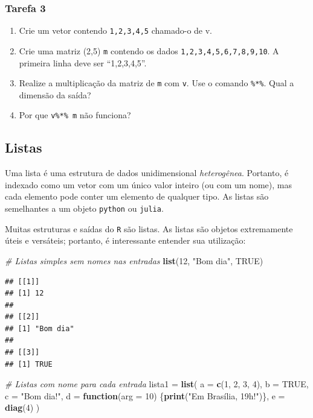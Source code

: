 \documentclass[
]{book}
\newenvironment{Shaded}{\begin{snugshade}}{\end{snugshade}}
\newcommand{\CommentTok}[1]{\textcolor[rgb]{0.56,0.35,0.01}{\textit{#1}}}
\newcommand{\ControlFlowTok}[1]{\textcolor[rgb]{0.13,0.29,0.53}{\textbf{#1}}}
\newcommand{\DataTypeTok}[1]{\textcolor[rgb]{0.13,0.29,0.53}{#1}}
\newcommand{\DecValTok}[1]{\textcolor[rgb]{0.00,0.00,0.81}{#1}}
\newcommand{\KeywordTok}[1]{\textcolor[rgb]{0.13,0.29,0.53}{\textbf{#1}}}
\newcommand{\NormalTok}[1]{#1}
\newcommand{\OtherTok}[1]{\textcolor[rgb]{0.56,0.35,0.01}{#1}}
\newcommand{\StringTok}[1]{\textcolor[rgb]{0.31,0.60,0.02}{#1}}
\providecommand{\tightlist}{%
  \setlength{\itemsep}{0pt}\setlength{\parskip}{0pt}}
\theoremstyle{definition}
\theoremstyle{definition}
\theoremstyle{definition}
\theoremstyle{remark}
\begin{document}
\hypertarget{tarefa-3}{%
\subsubsection{Tarefa 3}\label{tarefa-3}}

\begin{enumerate}
\def\labelenumi{\arabic{enumi}.}
\tightlist
\item
  Crie um vetor contendo \texttt{1,2,3,4,5} chamado-o de v.
\item
  Crie uma matriz (2,5) \texttt{m} contendo os dados \texttt{1,2,3,4,5,6,7,8,9,10}. A primeira linha deve ser ``1,2,3,4,5''.
\item
  Realize a multiplicação da matriz de \texttt{m} com \texttt{v}. Use o comando \texttt{\%*\%}. Qual a dimensão da saída?
\item
  Por que \texttt{v\%*\%\ m} não funciona?
\end{enumerate}

\hypertarget{listas}{%
\subsection{Listas}\label{listas}}

Uma lista é uma estrutura de dados unidimensional \emph{heterogênea}. Portanto, é indexado como um vetor com um único valor inteiro (ou com um nome), mas cada elemento pode conter um elemento de qualquer tipo. As listas são semelhantes a um objeto \texttt{python} ou \texttt{julia}.

Muitas estruturas e saídas do \texttt{R} são listas. As listas são objetos extremamente úteis e versáteis; portanto, é interessante entender sua utilização:

\begin{Shaded}
\begin{Highlighting}[]
\CommentTok{# Listas simples sem nomes nas entradas}
\KeywordTok{list}\NormalTok{(}\DecValTok{12}\NormalTok{, }\StringTok{"Bom dia"}\NormalTok{, }\OtherTok{TRUE}\NormalTok{)}
\end{Highlighting}
\end{Shaded}

\begin{verbatim}
## [[1]]
## [1] 12
## 
## [[2]]
## [1] "Bom dia"
## 
## [[3]]
## [1] TRUE
\end{verbatim}

\begin{Shaded}
\begin{Highlighting}[]
\CommentTok{# Listas com nome para cada entrada}
\NormalTok{lista1 =}\StringTok{ }\KeywordTok{list}\NormalTok{(}
  \DataTypeTok{a =} \KeywordTok{c}\NormalTok{(}\DecValTok{1}\NormalTok{, }\DecValTok{2}\NormalTok{, }\DecValTok{3}\NormalTok{, }\DecValTok{4}\NormalTok{),}
  \DataTypeTok{b =} \OtherTok{TRUE}\NormalTok{,}
  \DataTypeTok{c =} \StringTok{"Bom dia!"}\NormalTok{,}
  \DataTypeTok{d =} \ControlFlowTok{function}\NormalTok{(}\DataTypeTok{arg =} \DecValTok{10}\NormalTok{) \{}\KeywordTok{print}\NormalTok{(}\StringTok{"Em Brasília, 19h!"}\NormalTok{)\},}
  \DataTypeTok{e =} \KeywordTok{diag}\NormalTok{(}\DecValTok{4}\NormalTok{)}
\NormalTok{)}
\end{Highlighting}
\end{Shaded}
\end{document}
